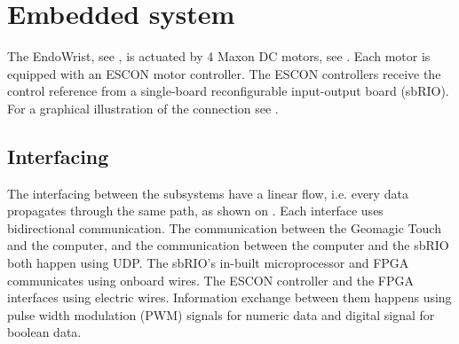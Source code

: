 \section{Embedded system}\label{sec:electronics}

The EndoWrist, see , is actuated by 4 Maxon DC motors, see . Each motor is equipped with an ESCON motor controller. The ESCON controllers receive the control reference from a single-board reconfigurable input-output board (sbRIO).   For a graphical illustration of the connection see .

\subsection{Interfacing}
The interfacing between the subsystems have a linear flow, i.e. every data propagates through the same path, as shown on . Each interface uses bidirectional communication. The communication between the Geomagic Touch and the computer, and the communication between the computer and the sbRIO both happen using UDP. The sbRIO's in-built microprocessor and FPGA communicates using onboard wires. The ESCON controller and the FPGA interfaces using electric wires. Information exchange between them happens using pulse width modulation (PWM) signals for numeric data and digital signal for boolean data.





%
